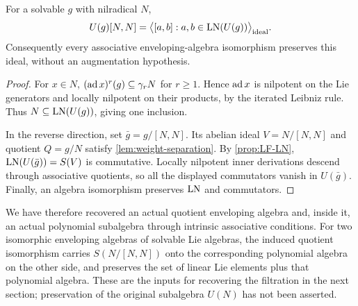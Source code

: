 \begin{proposition}\label{prop:intrinsic-ideal}
For a solvable $g$ with nilradical $N$,
\[
 U(g)[N,N]
 =\bigl\langle[a,b]:a,b\in\operatorname{LN}(U(g))\bigr\rangle_{\mathrm{ideal}}.
\]
Consequently every associative enveloping-algebra isomorphism preserves
this ideal, without an augmentation hypothesis.
\end{proposition}
\begin{proof}
For $x\in N$, $(\operatorname{ad} x)^r(g)\subseteq\gamma_rN$ for
$r\ge1$. Hence $\operatorname{ad} x$ is nilpotent on the Lie generators and
locally nilpotent on their products, by the iterated Leibniz rule.
Thus $N\subseteq\operatorname{LN}(U(g))$, giving one inclusion.

In the reverse direction, set $\bar{g}=g/[N,N]$.
Its abelian ideal $V=N/[N,N]$ and quotient $Q=g/N$
satisfy \cref{lem:weight-separation}. By \cref{prop:LF-LN},
$\operatorname{LN}(U(\bar{g}))=S(V)$ is commutative. Locally nilpotent
inner derivations descend through associative quotients, so all the
displayed commutators vanish in $U(\bar{g})$.
Finally, an algebra isomorphism preserves $\operatorname{LN}$ and commutators.
\end{proof}

We have therefore recovered an actual quotient enveloping algebra and,
inside it, an actual polynomial subalgebra through intrinsic associative
conditions. For two isomorphic enveloping algebras of solvable Lie
algebras, the induced quotient isomorphism carries $S(N/[N,N])$ onto
the corresponding polynomial algebra on the other side, and preserves
the set of linear Lie elements plus that polynomial algebra. These are
the inputs for recovering the filtration in the next section; preservation
of the original subalgebra $U(N)$ has not been asserted.
